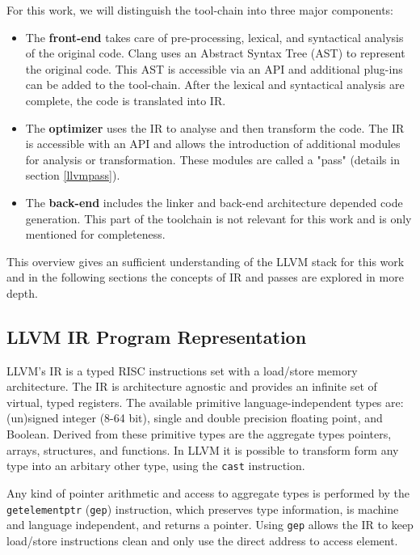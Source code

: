 For this work, we will distinguish the tool-chain into three major components:
\begin{itemize}
	\item The \textbf{front-end} takes care of pre-processing, lexical, and syntactical analysis of the original code. Clang uses an Abstract Syntax Tree (AST) to represent the original code. This AST is accessible via an API and additional plug-ins can be added to the tool-chain. After the lexical and syntactical analysis are complete, the code is translated into IR. 
	\item The \textbf{optimizer} uses the IR to analyse and then transform the code. The IR is accessible with an API and allows the introduction of additional modules for analysis or transformation. These modules are called a "pass" (details in section \ref{llvmpass}).
	\item The \textbf{back-end} includes the linker and back-end architecture depended code generation. This part of the
	toolchain is not relevant for this work and is only mentioned for completeness.
\end{itemize}
This overview gives an sufficient understanding of the LLVM stack for this work and in the following sections
the concepts of IR and passes are explored in more depth.

\subsection{LLVM IR Program Representation} \label{llvmir}
LLVM's IR is a typed RISC instructions set with a load/store memory architecture. The IR is architecture agnostic and provides an infinite set of virtual, typed registers. The available primitive language-independent types are: (un)signed integer (8-64 bit), single and double precision floating point, and Boolean. Derived from these primitive types are the aggregate types pointers, arrays, structures, and functions. In LLVM it is possible to transform form any type into an arbitary other type, using the \verb|cast| instruction. \cite{Lattner:2004:LCF:977395.977673}

Any kind of pointer arithmetic and access to aggregate types is performed by the \verb|getelementptr| (\verb|gep|) instruction, which preserves type information, is machine and language independent, and returns a pointer. Using \verb|gep| allows the IR to keep load/store instructions clean and only use the direct address to access element.
\cite{Lattner:2004:LCF:977395.977673}

